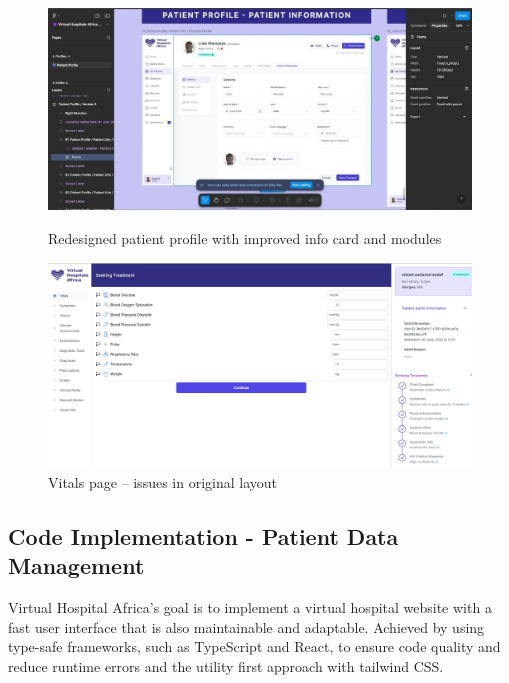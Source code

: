 \begin{figure}[H]
    \centering
    \begin{minipage}{0.47\textwidth}
        \centering
        \includegraphics[width=\textwidth]{images/(VHA)-5.jpg}
        \caption{Redesigned patient profile with improved info card and modules}
        \label{fig:desbign-5}
    \end{minipage}\hfill
    \begin{minipage}{0.47\textwidth}
        \centering
        \includegraphics[width=\textwidth]{images/(VHA)-6.jpg}
        \caption{Vitals page – issues in original layout}
        \label{fig:design-6}
    \end{minipage}
\end{figure}

\subsection{Code Implementation - Patient Data Management}

Virtual Hospital Africa's goal is to implement a virtual hospital website with a fast user interface that is also maintainable and adaptable. Achieved by using type-safe frameworks, such as TypeScript and React, to ensure code quality and reduce runtime errors and the utility first approach with tailwind CSS.

